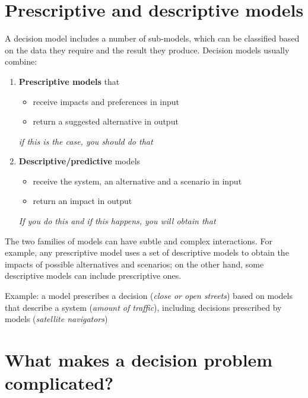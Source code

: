 \section{Prescriptive and descriptive models}
\label{sec:prescriptivedescriptive}

A decision model includes a number of sub-models, which can be classified based on the data they require and the result they produce. Decision models usually combine:
\begin{enumerate}
	\item \textbf{Prescriptive models} that
	\begin{itemize}
		\item receive impacts and preferences in input
		
		\item return a suggested alternative in output
	\end{itemize}
	\textit{if this is the case, you should do that}
	
	\item \textbf{Descriptive/predictive} models
	\begin{itemize}
		\item receive the system, an alternative and a scenario in input
		
		\item return an impact in output
	\end{itemize}
	\textit{If you do this and if this happens, you will obtain that}
\end{enumerate}

The two families of models can have subtle and complex interactions. For example, any prescriptive model uses a set of descriptive models to obtain the impacts of possible alternatives and scenarios; on the other hand, some descriptive models can include prescriptive ones.

Example: a model prescribes  a decision (\textit{close or open streets}) based on models that describe a system (\textit{amount of traffic}), including decisions prescribed by models (\textit{satellite navigators})

\section{What makes a decision problem complicated?}
\label{whycomplicated}

